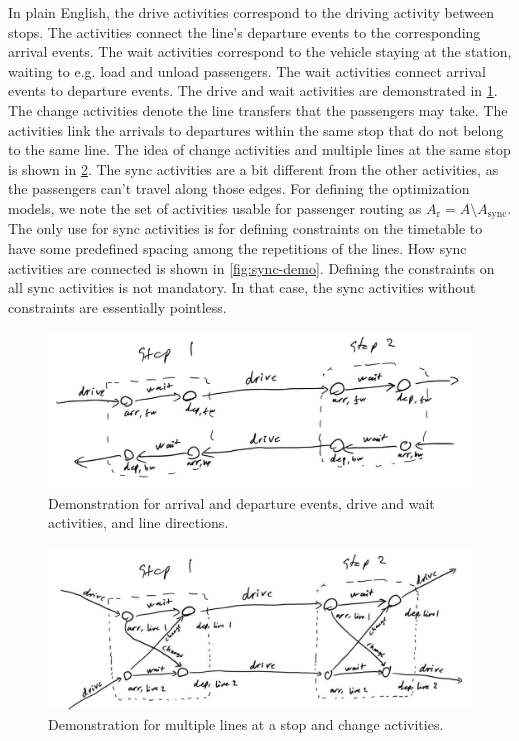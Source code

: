 \documentclass[english, 12pt, a4paper, sci, utf8, a-2b, online]{aaltothesis}
\newcommand{\Async}{A_\text{sync}}
\newcommand{\Ar}{A_\text{r}}
\begin{document}
In plain English, the drive activities correspond to the driving activity between stops. The activities connect the line's departure events to the corresponding arrival events. The wait activities correspond to the vehicle staying at the station, waiting to e.g. load and unload passengers. The wait activities connect arrival events to departure events. The drive and wait activities are demonstrated in \cref{fig:drive-wait-demo}. The change activities denote the line transfers that the passengers may take. The activities link the arrivals to departures within the same stop that do not belong to the same line. The idea of change activities and multiple lines at the same stop is shown in \cref{fig:change-demo}. The sync activities are a bit different from the other activities, as the passengers can't travel along those edges. For defining the optimization models, we note the set of activities usable for passenger routing as $\Ar = A \setminus \Async$. The only use for sync activities is for defining constraints on the timetable to have some predefined spacing among the repetitions of the lines. How sync activities are connected is shown in \cref{fig:sync-demo}. Defining the constraints on all sync activities is not mandatory. In that case, the sync activities without constraints are essentially pointless.


\begin{figure}
    \centering
    \includegraphics[width=1.0\textwidth]{figures/drive-wait-demo.jpg}
    \caption{Demonstration for arrival and departure events, drive and wait activities, and line directions.}
    \label{fig:drive-wait-demo}
\end{figure}

\begin{figure}
    \centering
    \includegraphics[width=1.0\textwidth]{figures/change-demo.jpg}
    \caption{Demonstration for multiple lines at a stop and change activities.}
    \label{fig:change-demo}
\end{figure}
\end{document}
